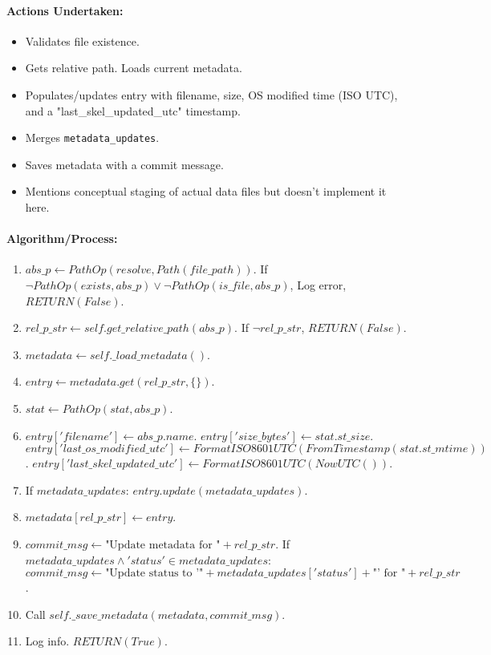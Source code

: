 \documentclass{article}
\begin{document}
\paragraph{Actions Undertaken:}
\begin{itemize}
    \item Validates file existence.
    \item Gets relative path. Loads current metadata.
    \item Populates/updates entry with filename, size, OS modified time (ISO UTC), and a "last\_skel\_updated\_utc" timestamp.
    \item Merges \texttt{metadata\_updates}.
    \item Saves metadata with a commit message.
    \item Mentions conceptual staging of actual data files but doesn't implement it here.
\end{itemize}
\paragraph{Algorithm/Process:}
\begin{enumerate}
    \item $abs\_p \leftarrow PathOp(resolve, Path(file\_path))$. If $\neg PathOp(exists, abs\_p) \lor \neg PathOp(is\_file, abs\_p)$, Log error, $RETURN(False)$.
    \item $rel\_p\_str \leftarrow self.get\_relative\_path(abs\_p)$. If $\neg rel\_p\_str$, $RETURN(False)$.
    \item $metadata \leftarrow self.\_load\_metadata()$.
    \item $entry \leftarrow metadata.get(rel\_p\_str, \{\})$.
    \item $stat \leftarrow PathOp(stat, abs\_p)$.
    \item $entry['filename'] \leftarrow abs\_p.name$. $entry['size\_bytes'] \leftarrow stat.st\_size$. $entry['last\_os\_modified\_utc'] \leftarrow FormatISO8601UTC(FromTimestamp(stat.st\_mtime))$. $entry['last\_skel\_updated\_utc'] \leftarrow FormatISO8601UTC(NowUTC())$.
    \item If $metadata\_updates$: $entry.update(metadata\_updates)$.
    \item $metadata[rel\_p\_str] \leftarrow entry$.
    \item $commit\_msg \leftarrow \text{"Update metadata for "} + rel\_p\_str$. If $metadata\_updates \land 'status' \in metadata\_updates$: $commit\_msg \leftarrow \text{"Update status to '"} + metadata\_updates['status'] + \text{"' for "} + rel\_p\_str$.
    \item Call $self.\_save\_metadata(metadata, commit\_msg)$.
    \item Log info. $RETURN(True)$.
\end{enumerate}
\end{document}
